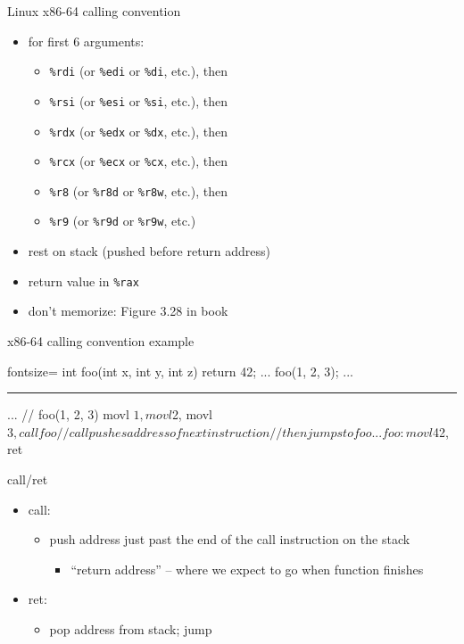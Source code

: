 \begin{frame}{Linux x86-64 calling convention}
    \begin{itemize}
    \item {} for first 6 arguments:
    \begin{itemize}
    \item {\tt \%rdi} (or {\tt \%edi} or {\tt \%di}, etc.), then
    \item {\tt \%rsi} (or {\tt \%esi} or {\tt \%si}, etc.), then
    \item {\tt \%rdx} (or {\tt \%edx} or {\tt \%dx}, etc.), then
    \item {\tt \%rcx} (or {\tt \%ecx} or {\tt \%cx}, etc.), then
    \item {\tt \%r8} (or {\tt \%r8d} or {\tt \%r8w}, etc.), then
    \item {\tt \%r9} (or {\tt \%r9d} or {\tt \%r9w}, etc.)
    \end{itemize}
    \item rest on stack (pushed before return address)
    \item return value in {\tt \%rax}
    \item don't memorize: Figure 3.28 in book
    \end{itemize}
\end{frame}


\begin{frame}[fragile,label=x8664CCExample]{x86-64 calling convention example}
\begin{ccodeNL*}{fontsize=\small}
int foo(int x, int y, int z) { return 42; }
...
    foo(1, 2, 3);
...
\end{ccodeNL*}
\hrule
\begin{asmcodeS}
...
    // foo(1, 2, 3)
    movl $1, %
    movl $2, %
    movl $3, %
    call foo  // call pushes address of next instruction
              // then jumps to foo
...
foo: 
    movl $42, %
    ret
\end{asmcodeS}
\end{frame}

\begin{frame}[fragile,label=stackFrame]{call/ret}
\begin{itemize}
\item call:
    \begin{itemize}
    \item push address just past the end of the call instruction on the stack
        \begin{itemize}
        \item ``return address'' -- where we expect to go when function finishes
        \end{itemize}
    \end{itemize}
\item ret:
    \begin{itemize}
    \item pop address from stack; jump
    \end{itemize}
\end{itemize}
\end{frame}

